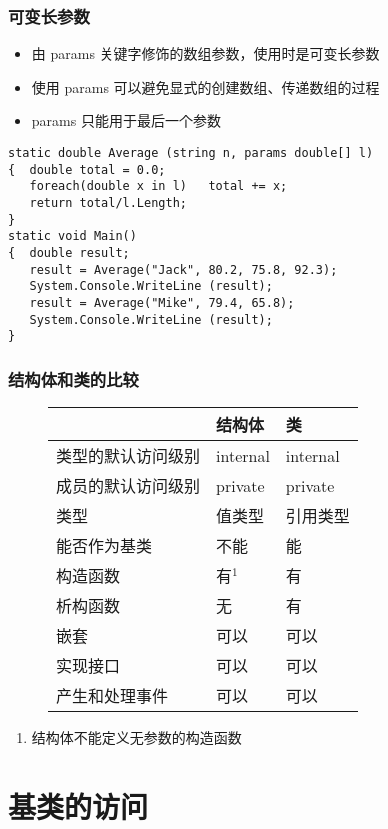 \begin{frame}[fragile]
\frametitle{可变长参数}
\begin{itemize}
\item 由 params 关键字修饰的数组参数，使用时是可变长参数
\item 使用 params 可以避免显式的创建数组、传递数组的过程
\item params 只能用于最后一个参数
\end{itemize}
\pause
\begin{lstlisting}
static double Average (string n, params double[] l)
{  double total = 0.0;
   foreach(double x in l)   total += x;
   return total/l.Length;
}
static void Main()
{  double result;
   result = Average("Jack", 80.2, 75.8, 92.3);
   System.Console.WriteLine (result);
   result = Average("Mike", 79.4, 65.8);
   System.Console.WriteLine (result);
}
\end{lstlisting}
\end{frame}

\begin{frame}
\frametitle{结构体和类的比较}
\begin{figure}
  \centering
  \begin{tabular}{l|l|l}
    \hline
                       & 结构体   & 类       \\
    \hline
    类型的默认访问级别 & internal & internal \\
    成员的默认访问级别 & private  & private  \\
    类型               & 值类型   & 引用类型 \\
    能否作为基类       & 不能     & 能       \\
    构造函数           & 有$^{1}$ & 有       \\
    析构函数           & 无       & 有       \\
    嵌套               & 可以     & 可以     \\
    实现接口           & 可以     & 可以     \\
    产生和处理事件     & 可以     & 可以     \\
    \hline
  \end{tabular}
\end{figure}
\begin{enumerate}
\item 结构体不能定义无参数的构造函数
\end{enumerate}

\end{frame}

\section{基类的访问}

